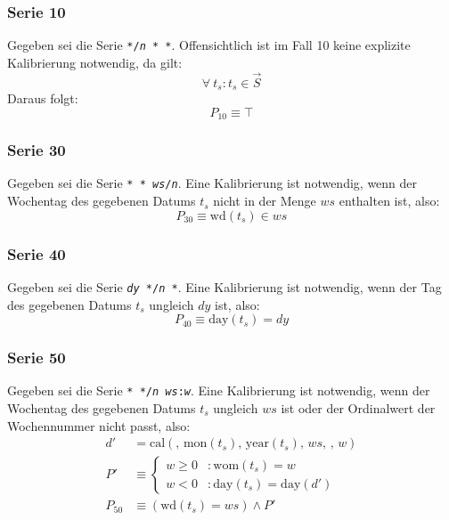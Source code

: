 \documentclass[a4paper]{article}
\newcommand*{\dayf}{\mathrm{day}}
\newcommand*{\monf}{\mathrm{mon}}
\newcommand*{\yearf}{\mathrm{year}}
\newcommand*{\wdf}{\mathrm{wd}}
\newcommand*{\womf}{\mathrm{wom}}
\newcommand*{\calf}{\mathrm{cal}}
\numberwithin{equation}{section}
\begin{document}
\subsubsection{Serie 10}
Gegeben sei die Serie \texttt{*/\textit{n} * *}. Offensichtlich ist im Fall 10
keine explizite Kalibrierung notwendig, da gilt:
\begin{equation}\forall\ t_s : t_s \in \vec{S}\end{equation}
Daraus folgt:
\begin{equation}P_{10} \equiv \top\end{equation}

\subsubsection{Serie 30}
Gegeben sei die Serie \texttt{* * \textit{ws}/\textit{n}}. Eine Kalibrierung ist
notwendig, wenn der Wochentag des gegebenen Datums $t_s$ nicht in der Menge $ws$
enthalten ist, also:
\begin{equation}P_{30} \equiv \wdf(t_s) \in ws\end{equation}

\subsubsection{Serie 40}
Gegeben sei die Serie \texttt{\textit{dy} */\textit{n} *}. Eine Kalibrierung ist
notwendig, wenn der Tag des gegebenen Datums $t_s$ ungleich $dy$ ist, also:
\begin{equation}P_{40} \equiv \dayf(t_s) = dy\end{equation}

\subsubsection{Serie 50}
Gegeben sei die Serie \texttt{* */\textit{n} \textit{ws}:\textit{w}}. Eine
Kalibrierung ist notwendig, wenn der Wochentag des gegebenen Datums $t_s$
ungleich $ws$ ist oder der Ordinalwert der Wochennummer nicht passt, also:
\begin{equation}
\begin{split}
  d' & = \calf(,\,\monf(t_s),\,\yearf(t_s),\,ws,\,,\,w) \\
  P' & \equiv \left\{\begin{array}{ll}
      w \ge 0 & : \womf(t_s) = w \\
      w < 0 & : \dayf(t_s) = \dayf(d')
    \end{array}\right. \\
  P_{50} & \equiv (\wdf(t_s) = ws) \wedge P'
\end{split}
\end{equation}
\end{document}
